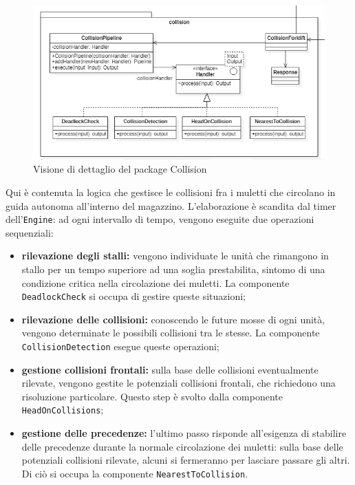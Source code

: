 \begin{figure}[H]
	\centering
	\includegraphics[scale=0.60]{res/diagrams/server/server_pack_collision.jpg}
	\caption{Visione di dettaglio del package Collision}
\end{figure}


Qui è contenuta la logica che gestisce le collisioni fra i muletti che circolano in guida autonoma all'interno del magazzino. L'elaborazione è scandita dal timer dell'\texttt{Engine}: ad ogni intervallo di tempo, vengono eseguite due operazioni sequenziali:
\begin{itemize}
	\item \textbf {rilevazione degli stalli:} vengono individuate le unità che rimangono in stallo per un tempo superiore ad una soglia prestabilita, sintomo di una condizione critica nella circolazione dei muletti. La componente \texttt{DeadlockCheck} si occupa di gestire queste situazioni;
	\item \textbf{rilevazione delle collisioni:} conoscendo le future mosse di ogni unità, vengono determinate le possibili collisioni tra le stesse. La componente \texttt{CollisionDetection} esegue queste operazioni;
	\item \textbf{gestione collisioni frontali:} sulla base delle collisioni eventualmente rilevate, vengono gestite le potenziali collisioni frontali, che richiedono una risoluzione particolare. Questo step è svolto dalla componente \texttt{HeadOnCollisions};
	\item \textbf{gestione delle precedenze:} l'ultimo passo risponde all'esigenza di stabilire delle precedenze durante la normale circolazione dei muletti: sulla base delle potenziali collisioni rilevate, alcuni si fermeranno per lasciare passare gli altri. Di ciò si occupa la componente \texttt{NearestToCollision}.
\end{itemize}


